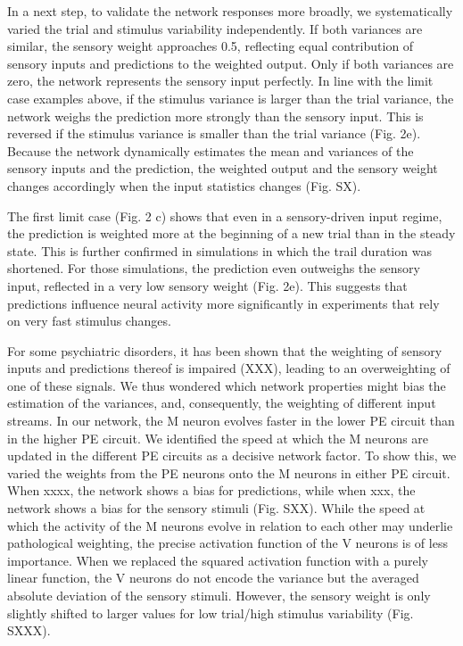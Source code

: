 \documentclass[10pt,a4paper,draft]{article}
\begin{document}
In a next step, to validate the network responses more broadly, we systematically varied the trial and stimulus variability independently. If both variances are similar, the sensory weight approaches 0.5, reflecting equal contribution of sensory inputs and predictions to the weighted output. Only if both variances are zero, the network represents the sensory input perfectly. In line with the limit case examples above, if the stimulus variance is larger than the trial variance, the network weighs the prediction more strongly than the sensory input. This is reversed if the stimulus variance is smaller than the trial variance (Fig. 2e). Because the network dynamically estimates the mean and variances of the sensory inputs and the prediction, the weighted output and the sensory weight changes accordingly when the input statistics changes (Fig. SX). 

The first limit case (Fig. 2 c) shows that even in a sensory-driven input regime, the prediction is weighted more at the beginning of a new trial than in the steady state. This is further confirmed in simulations in which the trail duration was shortened. For those simulations, the prediction even outweighs the sensory input, reflected in a very low sensory weight (Fig. 2e). This suggests that predictions influence neural activity more significantly in experiments that rely on very fast stimulus changes. 

For some psychiatric disorders, it has been shown that the weighting of sensory inputs and predictions thereof is impaired (XXX), leading to an overweighting of one of these signals. We thus wondered which network properties might bias the estimation of the variances, and, consequently, the weighting of different input streams. In our network, the M neuron evolves faster in the lower PE circuit than in the higher PE circuit. We identified the speed at which the M neurons are updated in the different PE circuits as a decisive network factor. To show this, we varied the weights from the PE neurons onto the M neurons in either PE circuit. When xxxx, the network shows a bias for predictions, while when xxx, the network shows a bias for the sensory stimuli (Fig. SXX). While the speed at which the activity of the M neurons evolve in relation to each other may underlie pathological weighting, the precise activation function of the V neurons is of less importance. When we replaced the squared activation function with a purely linear function, the V neurons do not encode the variance but the averaged absolute deviation of the sensory stimuli. However, the sensory weight is only slightly shifted to larger values for low trial/high stimulus variability (Fig. SXXX). 
\end{document}
